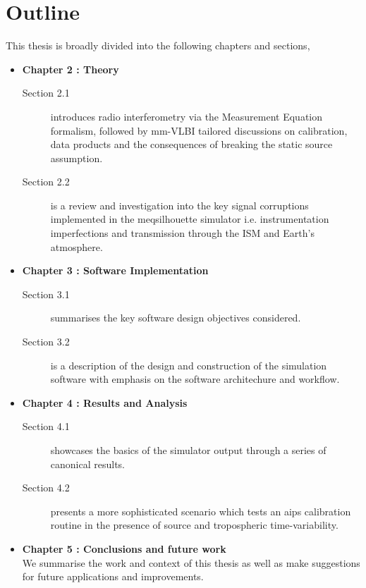 \section{Outline}

This thesis is broadly divided into the following chapters and sections,
\begin{itemize}
 \item {\bf Chapter 2 : Theory} 
 \begin{description}
  \item [Section 2.1] introduces radio interferometry via the Measurement Equation formalism, followed by mm-VLBI tailored discussions on calibration, data products and the consequences of breaking the static source assumption.
  \item [Section 2.2] is a review and investigation into the key signal corruptions implemented in the {\sc meqsilhouette} simulator i.e. instrumentation imperfections and transmission through the ISM and Earth's atmosphere.
 \end{description}

 \item {\bf Chapter 3 : Software Implementation}
 \begin{description}
  \item [Section 3.1] summarises the key software design objectives considered.
  \item [Section 3.2] is a description of the design and construction of the simulation software with emphasis on the software architechure and workflow.
 \end{description}

 
 \item {\bf Chapter 4 : Results and Analysis}
 \begin{description}
  \item  [Section 4.1] showcases the basics of the simulator output through a series of canonical results.
  \item [Section 4.2] presents a more sophisticated scenario which tests an {\sc aips} calibration routine in the presence of source and tropospheric time-variability.
 \end{description}
  
  \item {\bf Chapter 5 : Conclusions and future work}\\
  We summarise the work and context of this thesis as well as make suggestions for future applications and improvements.
 
\end{itemize}
















